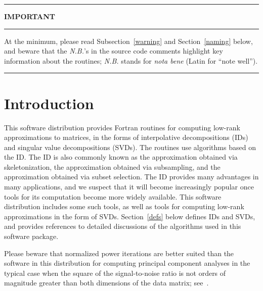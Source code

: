 \documentclass[letterpaper,12pt]{article}
\begin{document}
\newpage

\tableofcontents

\newpage



\hrule

\medskip

\centerline{\Large \bf IMPORTANT}

\medskip

\hrule

\medskip

\noindent At the minimum, please read Subsection~\ref{warning}
and Section~\ref{naming} below, and beware that the {\it N.B.}'s
in the source code comments highlight key information about the routines;
{\it N.B.} stands for {\it nota bene} (Latin for ``note well'').

\medskip

\hrule

\bigskip



\section{Introduction}

This software distribution provides Fortran routines
for computing low-rank approximations to matrices,
in the forms of interpolative decompositions (IDs)
and singular value decompositions (SVDs).
The routines use algorithms based on the ID.
The ID is also commonly known as
the approximation obtained via skeletonization,
the approximation obtained via subsampling,
and the approximation obtained via subset selection.
The ID provides many advantages in many applications,
and we suspect that it will become increasingly popular
once tools for its computation become more widely available.
This software distribution includes some such tools,
as well as tools for computing low-rank approximations
in the form of SVDs.
Section~\ref{defs} below defines IDs and SVDs,
and provides references to detailed discussions of the algorithms
used in this software package.

Please beware that normalized power iterations are better suited than
the software in this distribution
for computing principal component analyses
in the typical case when the square of the signal-to-noise ratio
is not orders of magnitude greater than both dimensions
of the data matrix; see~\cite{halko-martinsson-tropp}.
\end{document}
